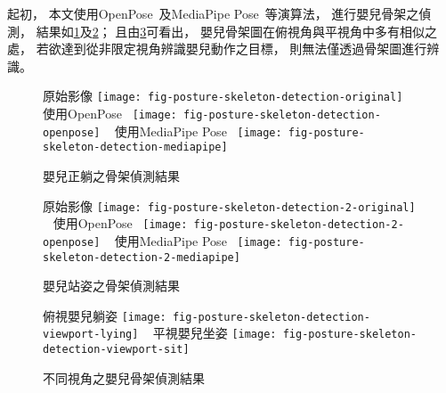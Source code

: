 \documentclass[class=NCU_thesis, crop=false]{standalone}
\begin{document}
起初，
本文使用OpenPose~\cite{cao_openpose_2019}及MediaPipe Pose~\cite{noauthor_pose_nodate}等演算法，
進行嬰兒骨架之偵測，
結果如\cref{fig:fig-posture-skeleton-detection}及\cref{fig:fig-posture-skeleton-detection-2}；
且由\cref{fig:fig-posture-skeleton-detection-viewport}可看出，
嬰兒骨架圖在俯視角與平視角中多有相似之處，
若欲達到從非限定視角辨識嬰兒動作之目標，
則無法僅透過骨架圖進行辨識。
\begin{figure}[!hbt]
    \centering
    \subcaptionbox
        {原始影像
        \label{fig:fig-posture-skeleton-detection-original}}
        {\texttt{[image: fig-posture-skeleton-detection-original]}}
    ~
    \subcaptionbox
        {使用OpenPose~\cite{cao_openpose_2019}
        \label{fig:fig-posture-skeleton-detection-openpose}}
        {\texttt{[image: fig-posture-skeleton-detection-openpose]}}
    ~
    \subcaptionbox
        {使用MediaPipe Pose~\cite{noauthor_pose_nodate}
        \label{fig:fig-posture-skeleton-detection-mediapipe}}
        {\texttt{[image: fig-posture-skeleton-detection-mediapipe]}}
    \caption{嬰兒正躺之骨架偵測結果}
    \label{fig:fig-posture-skeleton-detection}
\end{figure}
\begin{figure}[!hbt]
    \centering
    \subcaptionbox
        {原始影像
        \label{fig:fig-posture-skeleton-detection-2-original}}
        {\texttt{[image: fig-posture-skeleton-detection-2-original]}}
    ~
    \subcaptionbox
        {使用OpenPose~\cite{cao_openpose_2019}
        \label{fig:fig-posture-skeleton-detection-2-openpose}}
        {\texttt{[image: fig-posture-skeleton-detection-2-openpose]}}
    ~
    \subcaptionbox
        {使用MediaPipe Pose~\cite{noauthor_pose_nodate}
        \label{fig:fig-posture-skeleton-detection-2-mediapipe}}
        {\texttt{[image: fig-posture-skeleton-detection-2-mediapipe]}}
    \caption{嬰兒站姿之骨架偵測結果}
    \label{fig:fig-posture-skeleton-detection-2}
\end{figure}
\begin{figure}[!hbt]
    \centering
    \subcaptionbox
        {俯視嬰兒躺姿
        \label{fig:fig-posture-skeleton-detection-viewport-lying}}
        {\texttt{[image: fig-posture-skeleton-detection-viewport-lying]}}
    ~
    \subcaptionbox
        {平視嬰兒坐姿
        \label{fig:fig-posture-skeleton-detection-viewport-sit}}
        {\texttt{[image: fig-posture-skeleton-detection-viewport-sit]}}
    \caption{不同視角之嬰兒骨架偵測結果}
    \label{fig:fig-posture-skeleton-detection-viewport}
\end{figure}
\end{document}

